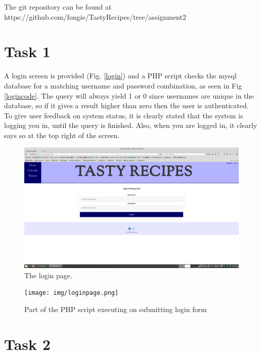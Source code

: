 \documentclass[a4paper]{scrreprt}
\begin{document}
The git repository can be found at https://github.com/fongie/TastyRecipes/tree/assignment2

\section{Task 1}

A login screen is provided (Fig. \ref{login}) and a PHP script checks the mysql database for a matching username and password combination, as seen in Fig \ref{logincode}. The query will always yield 1 or 0 since usernames are unique in the database, so if it gives a result higher than zero then the user is authenticated. To give user feedback on system status, it is clearly stated that the system is logging you in, until the query is finished. Also, when you are logged in, it clearly says so at the top right of the screen.

\begin{figure}[h!]
  \begin{center}
    \includegraphics[scale=0.41]{img/login.png}
    \caption{The login page.}
    \label{fig:login}
  \end{center}
\end{figure}

\begin{figure}[h!]
  \begin{center}
    \texttt{[image: img/loginpage.png]}
    \caption{Part of the PHP script executing on submitting login form}
    \label{fig:loginpage}
  \end{center}
\end{figure}

\section{Task 2}
\end{document}
